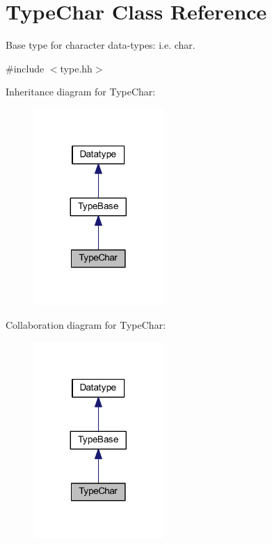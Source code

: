 \hypertarget{class_type_char}{}\section{Type\+Char Class Reference}
\label{class_type_char}


Base type for character data-\/types\+: i.\+e. char.  




{\ttfamily \#include $<$type.\+hh$>$}



Inheritance diagram for Type\+Char\+:
\nopagebreak
\begin{figure}[H]
\begin{center}
\leavevmode
\includegraphics[width=140pt]{class_type_char__inherit__graph}
\end{center}
\end{figure}


Collaboration diagram for Type\+Char\+:
\nopagebreak
\begin{figure}[H]
\begin{center}
\leavevmode
\includegraphics[width=140pt]{class_type_char__coll__graph}
\end{center}
\end{figure}
